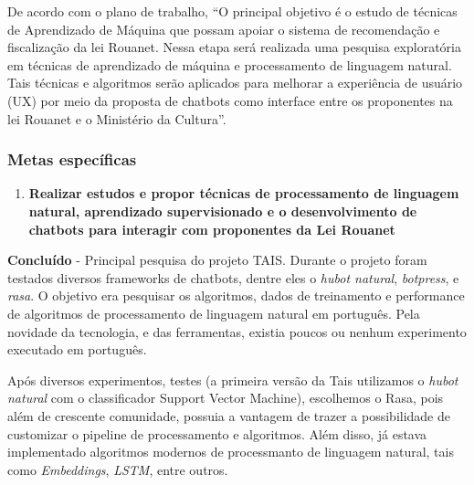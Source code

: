 De acordo com o plano de trabalho, ``O principal objetivo é o estudo de
técnicas de Aprendizado de Máquina que possam apoiar o sistema de
recomendação e fiscalização da lei Rouanet. Nessa etapa será realizada
uma pesquisa exploratória em técnicas de aprendizado de máquina e
processamento de linguagem natural. Tais técnicas e algoritmos serão
aplicados para melhorar a experiência de usuário (UX) por meio da
proposta de chatbots como interface entre os proponentes na lei Rouanet
e o Ministério da Cultura''.

\hypertarget{metas-especuxedficas-3}{%
\subsubsection{Metas específicas}\label{metas-especuxedficas-3}}

\begin{enumerate}
\def\labelenumi{\arabic{enumi}.}
\tightlist
\item
  \textbf{Realizar estudos e propor técnicas de processamento de
  linguagem natural, aprendizado supervisionado e o desenvolvimento de
  chatbots para interagir com proponentes da Lei Rouanet}
\end{enumerate}

\textbf{Concluído} - Principal pesquisa do projeto TAIS. Durante o
projeto foram testados diversos frameworks de chatbots, dentre eles o
\emph{hubot natural}, \emph{botpress}, e \emph{rasa}. O objetivo era
pesquisar os algoritmos, dados de treinamento e performance de
algoritmos de processamento de linguagem natural em português. Pela
novidade da tecnologia, e das ferramentas, existia poucos ou nenhum
experimento executado em português.

Após diversos experimentos, testes (a primeira versão da Tais utilizamos
o \emph{hubot natural} com o classificador Support Vector Machine),
escolhemos o Rasa, pois além de crescente comunidade, possuia a vantagem
de trazer a possibilidade de customizar o pipeline de processamento e
algoritmos. Além disso, já estava implementado algoritmos modernos de
processmanto de linguagem natural, tais como \emph{Embeddings},
\emph{LSTM}, entre outros.

